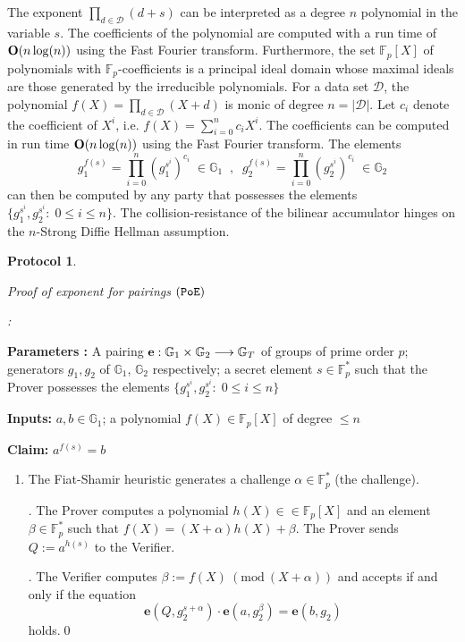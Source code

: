 \documentclass[11pt, lettersize, notitlepage, leqno, footskip=0.6cm]{article}
\newcommand{\bFp}{\mathbb{F}_p}
\newcommand{\lra}{\longrightarrow}
\newcommand{\mc}{\mathcal}
\newcommand{\mb}{\mathbb}
\newcommand{\al}{\alpha}
\newcommand{\be}{\beta}
\newcommand{\vs}{\vspace{-0.15cm}}
\newcommand{\Mod}[1]{\ (\mathrm{mod}\ #1)}
\newtheorem{Prot}[Thm]{Protocol}
\numberwithin{equation}{section}
\begin{document}
The exponent $\prod\limits_{d\in \mc{D}} (d+s)$ can be interpreted as a degree $n$ polynomial in the variable $s$. The coefficients of the polynomial are computed with a run time of ${\bf{O}} (n\log(n))$ using the Fast Fourier transform. Furthermore, the set $\bFp[X]$ of polynomials with $\bFp$-coefficients is a principal ideal domain whose maximal ideals are those generated by the irreducible polynomials. For a data set $\mc{D}$, the polynomial $f(X) = \prod\limits_{d\in \mc{D}}(X+d)$ is monic of degree $n = |\mc{D}|$. Let $c_i$ denote the coefficient of $X^i$, i.e. $f(X) = \sum\limits_{i=0}^n c_iX^i$. The coefficients can be computed in run time ${\bf{O}}(n\log(n))$ using the Fast Fourier transform. The elements $$g_1^{f(s)} = \prod\limits_{i=0}^n (g_1^{s^i})^{c_i}\;\in\mb{G}_1\;\;,\;\;g_2^{f(s)} = \prod\limits_{i=0}^n (g_2^{s^i})^{c_i}\;\in\mb{G}_2 $$ can then be computed by any party that possesses the elements $\{g_1^{s^i}, g_2^{s^i} :\; 0\leq i \leq n  \}$. The collision-resistance of the bilinear accumulator hinges on the $n$-Strong Diffie Hellman assumption. 


\begin{Prot} \hypertarget{PoE}{ \textit{Proof of exponent for pairings} $(\tt{PoE})$}:\end{Prot} \vspace{-0.3cm}

\noindent \textbf{Parameters :} A pairing ${\bf{e}}: \mb{G}_1\times \mb{G}_2\lra \mb{G}_T$ of groups of prime order $p$; generators $g_1, g_2$ of $\mb{G}_1$, $\mb{G}_2$ respectively; a secret element $s\in \bFp^*$ such that the Prover possesses the elements $\{g_1^{s^i}, g_2^{s^i}:\; 0\leq i\leq n \}$ 

\noindent \textbf{Inputs:} $a,b\in \mb{G}_1$; a polynomial $f(X)\in \bFp[X]$ of degree $\leq n$

\noindent \textbf{Claim:} $a^{f(s)} = b$

\begin{enumerate}[wide, labelwidth=!, labelindent=0pt] \vs \item The Fiat-Shamir heuristic generates a challenge $\al\in \bFp^*$ (the challenge).

. The Prover computes a polynomial $h(X)\in \in \bFp[X]$ and an element $\be\in \bFp^*$ such that $f(X) = (X+\al)h(X)+ \be$. The Prover sends $Q:= a^{h(s)}$ to the Verifier.

. The Verifier computes $\be:= f(X)\Mod{(X+\al)}$ and accepts if and only if the equation \vs $$\mathbf{e}(Q, g_2^{s+\al})\cdot\mathbf{e}(a, g_2^{\be})  = \mathbf{e}(b, g_2)$$ holds.\qed \end{enumerate}
\end{document}
